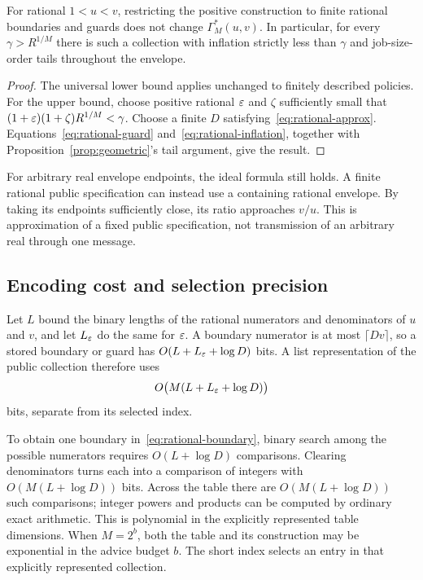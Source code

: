 \begin{theorem}\label{thm:rational-infimum}
For rational $1<u<v$, restricting the positive construction to finite rational boundaries and guards does not change $\Gamma_M^*(u,v)$. In particular, for every $\gamma>R^{1/M}$ there is such a collection with inflation strictly less than $\gamma$ and job-size-order tails throughout the envelope.
\end{theorem}
\begin{proof}
The universal lower bound applies unchanged to finitely described policies. For the upper bound, choose positive rational $\varepsilon$ and $\zeta$ sufficiently small that $(1+\varepsilon)(1+\zeta)R^{1/M}<\gamma$. Choose a finite $D$ satisfying~\eqref{eq:rational-approx}. Equations~\eqref{eq:rational-guard} and~\eqref{eq:rational-inflation}, together with Proposition~\ref{prop:geometric}'s tail argument, give the result.
\end{proof}

For arbitrary real envelope endpoints, the ideal formula still holds. A finite rational public specification can instead use a containing rational envelope. By taking its endpoints sufficiently close, its ratio approaches $v/u$. This is approximation of a fixed public specification, not transmission of an arbitrary real through one message.

\subsection{Encoding cost and selection precision}
Let $L$ bound the binary lengths of the rational numerators and denominators of $u$ and $v$, and let $L_\varepsilon$ do the same for $\varepsilon$. A boundary numerator is at most $\lceil Dv\rceil$, so a stored boundary or guard has $O(L+L_\varepsilon+\log D)$ bits. A list representation of the public collection therefore uses
\begin{equation}\label{eq:table-storage}
 O\bigl(M(L+L_\varepsilon+\log D)\bigr)
\end{equation}
bits, separate from its selected index.

To obtain one boundary in~\eqref{eq:rational-boundary}, binary search among the possible numerators requires $O(L+\log D)$ comparisons. Clearing denominators turns each into a comparison of integers with $O(M(L+\log D))$ bits. Across the table there are $O(M(L+\log D))$ such comparisons; integer powers and products can be computed by ordinary exact arithmetic. This is polynomial in the explicitly represented table dimensions. When $M=2^b$, both the table and its construction may be exponential in the advice budget $b$. The short index selects an entry in that explicitly represented collection.

